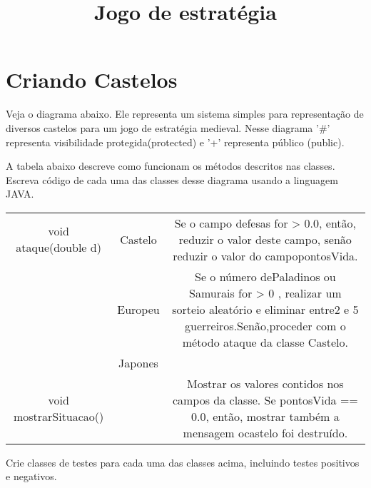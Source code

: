\documentclass{article}
\begin{document}
\title{Jogo de estratégia}
\maketitle
\newpage
\section*{Criando Castelos}
Veja o diagrama abaixo. Ele representa um sistema simples para representação de diversos castelos para um jogo de estratégia medieval. Nesse diagrama '#' representa visibilidade protegida(protected) e  '+' representa público (public).
\par A tabela abaixo descreve como funcionam os métodos descritos nas classes.
Escreva código de cada uma das classes desse diagrama usando a linguagem JAVA. \\
\begin{tabular}{|c|c|c|}
	void ataque(double d) & Castelo & Se o campo defesas for > 0.0, então, reduzir o valor deste campo, senão reduzir o valor do campo​ pontosVida. \\ 		& Europeu & Se​ o número​ de​Paladinos ou​​ Samurais​ for > 0 , realizar um sorteio​ aleatório e​ eliminar entre​2​ e​ 5​ guerreiros.​ Senão,​proceder com o método ataque da​ classe Castelo. \\
	& Japones & \\
	void mostrarSituacao() & & Mostrar​ os valores​ contidos nos campos da classe. Se​ pontosVida​ == 0.0, então, mostrar​ também​ a mensagem o​ castelo foi​ destruído. \\
\end{tabular}
\par Crie classes de testes​ para cada uma das classes acima, incluindo testes​ positivos​ e negativos.
\end{document}
